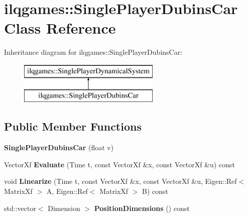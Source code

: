 \hypertarget{classilqgames_1_1_single_player_dubins_car}{}\section{ilqgames\+:\+:Single\+Player\+Dubins\+Car Class Reference}
\label{classilqgames_1_1_single_player_dubins_car}
Inheritance diagram for ilqgames\+:\+:Single\+Player\+Dubins\+Car\+:\begin{figure}[H]
\begin{center}
\leavevmode
\includegraphics[height=2.000000cm]{classilqgames_1_1_single_player_dubins_car}
\end{center}
\end{figure}
\subsection*{Public Member Functions}
\begin{DoxyCompactItemize}
\item 
{\bfseries Single\+Player\+Dubins\+Car} (float v)\hypertarget{classilqgames_1_1_single_player_dubins_car_aa035123822485f51501c6f0f21a59c34}{}\label{classilqgames_1_1_single_player_dubins_car_aa035123822485f51501c6f0f21a59c34}

\item 
Vector\+Xf {\bfseries Evaluate} (Time t, const Vector\+Xf \&x, const Vector\+Xf \&u) const \hypertarget{classilqgames_1_1_single_player_dubins_car_a8f44090ac61f4543043fd9351b9192bb}{}\label{classilqgames_1_1_single_player_dubins_car_a8f44090ac61f4543043fd9351b9192bb}

\item 
void {\bfseries Linearize} (Time t, const Vector\+Xf \&x, const Vector\+Xf \&u, Eigen\+::\+Ref$<$ Matrix\+Xf $>$ A, Eigen\+::\+Ref$<$ Matrix\+Xf $>$ B) const \hypertarget{classilqgames_1_1_single_player_dubins_car_a0466e2d039801047333f506909a514e9}{}\label{classilqgames_1_1_single_player_dubins_car_a0466e2d039801047333f506909a514e9}

\item 
std\+::vector$<$ Dimension $>$ {\bfseries Position\+Dimensions} () const \hypertarget{classilqgames_1_1_single_player_dubins_car_a8fa496334c963b72dd1ee48658cc1feb}{}\label{classilqgames_1_1_single_player_dubins_car_a8fa496334c963b72dd1ee48658cc1feb}

\end{DoxyCompactItemize}
